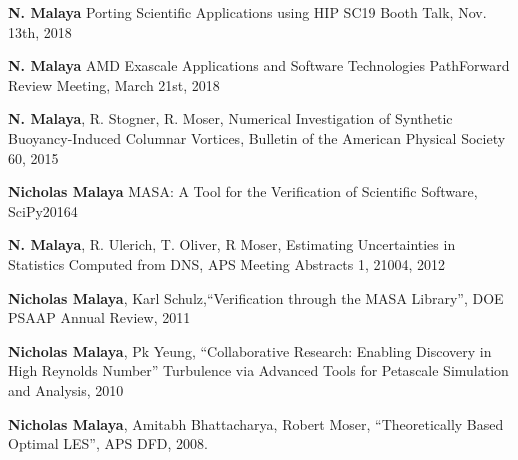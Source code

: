 \textbf{N. Malaya}
Porting Scientific Applications using HIP
SC19 Booth Talk, Nov. 13th, 2018

\blankline

\textbf{N. Malaya}
AMD Exascale Applications and Software Technologies
PathForward Review Meeting, March 21st, 2018

\blankline

\textbf{N. Malaya}, R. Stogner, R. Moser,
Numerical Investigation of Synthetic Buoyancy-Induced Columnar Vortices,
Bulletin of the American Physical Society 60, 2015

\blankline

\textbf{Nicholas Malaya}
MASA: A Tool for the Verification of Scientific Software, SciPy20164
\blankline

\textbf{N. Malaya}, R. Ulerich, T. Oliver, R Moser, Estimating Uncertainties in
Statistics Computed from DNS, APS Meeting Abstracts 1, 21004, 2012 

\blankline

\textbf{Nicholas Malaya}, Karl Schulz,``Verification through the MASA Library'', DOE
PSAAP Annual Review, 2011

\blankline

\textbf{Nicholas Malaya},  Pk Yeung, ``Collaborative Research: Enabling Discovery in High Reynolds Number''
Turbulence via Advanced Tools for Petascale Simulation and Analysis, 2010

\blankline

\textbf{Nicholas Malaya}, Amitabh Bhattacharya, Robert Moser,
``Theoretically Based Optimal LES'', APS DFD, 2008.
